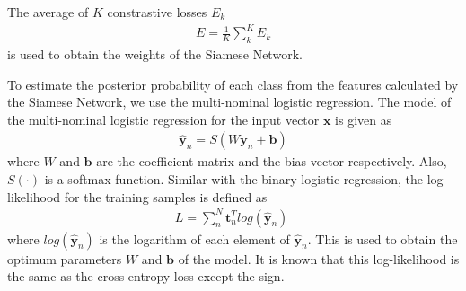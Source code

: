 \documentclass[twocolumn,10pt]{article}
\begin{document}
The average of $K$ constrastive losses $E_k$  
\begin{align} \label{eq:ave contrastive}
E = \frac{1}{K}\sum_{k}^{K}E_k
\end{align}
is used to obtain the weights of the Siamese Network.

To estimate the posterior probability of each class from the features calculated by the Siamese Network, we use the multi-nominal logistic regression.
The model of the multi-nominal logistic regression for the input vector $\bm{x}$ is given as
\begin{align} \label{eq:regression multi}
    \hat{\bm y}_n = S(W\bm{y}_n+\bm{b})
\end{align}
where $W$ and $\bm{b}$ are the coefficient matrix and the bias vector respectively.
Also, $S(\cdot)$ is a softmax function.
Similar with the binary logistic regression, the log-likelihood for the training samples is defined as
\begin{align} \label{eq:multi crossentropy}
L = \sum_n^N {\bm t}_n^Tlog(\hat{\bm y}_n) \; 
\end{align}
where $log(\hat{\bm y}_n)$ is the logarithm of each element of $\hat{\bm y}_n$. 
This is used to obtain the optimum parameters $W$ and $\bm{b}$ of the model.
It is known that this log-likelihood is the same as the cross entropy loss except the sign.
\end{document}

